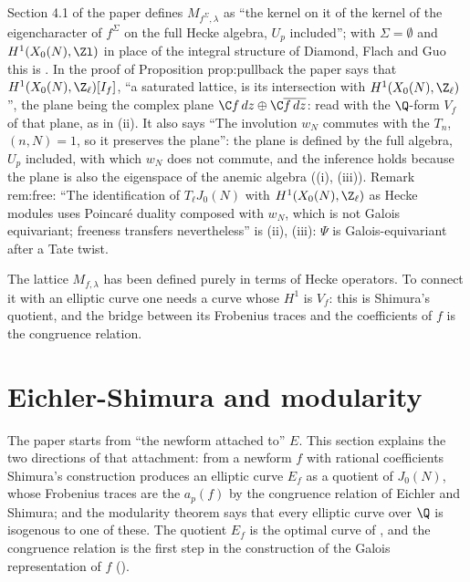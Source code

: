 \begin{paperlink}\label{pl:moddeg:f-lattice}
Section 4.1 of the paper defines $M_{f^\Sigma,\lambda}$ as ``the kernel on it of the kernel of the eigencharacter of $f^\Sigma$ on the full Hecke algebra, $U_p$ included''; with
$\Sigma=\emptyset$ and $H^1(X_0(N),\Zl)$ in place of the integral structure of Diamond, Flach and Guo this is . In the proof of
Proposition prop:pullback the paper says that $H^1(X_0(N),\Z_\ell)[I_f]$, ``a saturated lattice, is its intersection with $H^1(X_0(N),\Z_\ell)$'', the plane being the complex
plane $\C f\,dz\oplus\C\overline{f\,dz}$: read with the $\Q$-form $V_f$ of that plane, as in (ii). It also says ``The involution $w_N$ commutes with the
$T_n$, $(n,N)=1$, so it preserves the plane'': the plane is defined by the full algebra, $U_p$ included, with which $w_N$ does not commute, and the inference holds because the
plane is also the eigenspace of the anemic algebra ((i), (iii)). Remark rem:free: ``The identification of $T_\ell J_0(N)$ with $H^1(X_0(N),\Z_\ell)$ as
Hecke modules uses Poincar\'e duality composed with $w_N$, which is not Galois equivariant; freeness transfers nevertheless'' is (ii), (iii):
$\Psi$ is Galois-equivariant after a Tate twist.
\end{paperlink}

The lattice $M_{f,\lambda}$ has been defined purely in terms of Hecke operators. To connect it with an elliptic curve one needs a curve whose $H^1$ is $V_f$: this is
Shimura's quotient, and the bridge between its Frobenius traces and the coefficients of $f$ is the congruence relation.

\section{Eichler-Shimura and modularity}\label{sec:moddeg:eichler-shimura}

The paper starts from ``the newform attached to'' $E$. This section explains the two directions of that attachment: from a newform $f$ with rational coefficients
Shimura's construction produces an elliptic curve $E_f$ as a quotient of $J_0(N)$, whose Frobenius traces are the $a_p(f)$ by the congruence relation of Eichler and
Shimura; and the modularity theorem says that every elliptic curve over $\Q$ is isogenous to one of these. The quotient $E_f$ is the optimal curve of
, and the congruence relation is the first step in the construction of the Galois representation of $f$ ().

